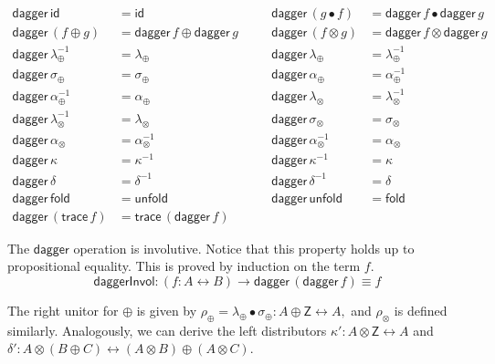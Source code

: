 \documentclass[runningheads,a4paper]{llncs}
\newcommand{\Ty}{\mathsf{Ty}}
\newcommand{\id}{\mathsf{id}}
\newcommand{\lr}{\longleftrightarrow}
\newcommand{\fold}{\mathsf{fold}}
\newcommand{\unfold}{\mathsf{unfold}}
\newcommand{\trace}{\ensuremath{\mathsf{trace}}}
\newcommand{\Z}{\mathsf{Z}}
\renewcommand{\dagger}{\mathsf{dagger}}
\begin{document}
\[
\begin{array}{llcll}
\dagger \,\id &= \id & \quad &
\dagger\, (g \bullet f) & = \dagger\, f \bullet \dagger\, g \\
\dagger\, (f \oplus g) & = \dagger\, f \oplus \dagger\, g & \quad &
\dagger\, (f \otimes g) & = \dagger\, f \otimes \dagger\, g \\
\dagger\, \lambda_\oplus ^{-1} & = \lambda_\oplus & \quad &
\dagger\, \lambda_\oplus & = \lambda_\oplus^{-1} \\
\dagger\, \sigma_\oplus & = \sigma_\oplus & \quad &
\dagger\, \alpha_\oplus & = \alpha_\oplus^{-1} \\
\dagger\, \alpha_\oplus^{-1} & = \alpha_\oplus & \quad &
\dagger\, \lambda_\otimes & = \lambda_\otimes^{-1} \\
\dagger\, \lambda_\otimes ^{-1} & = \lambda_\otimes & \quad &
\dagger\, \sigma_\otimes & = \sigma_\otimes \\
\dagger\, \alpha_\otimes & = \alpha_\otimes^{-1} & \quad &
\dagger\, \alpha_\otimes^{-1} & = \alpha_\otimes \\
\dagger\, \kappa & = \kappa^{-1} & \quad &
\dagger\, \kappa^{-1} & = \kappa \\
\dagger\, \delta & = \delta^{-1} & \quad &
\dagger\, \delta^{-1} & = \delta \\
\dagger\, \fold & = \unfold & \quad &
\dagger\, \unfold & = \fold \\
\dagger\, (\trace \,f) & = \trace \,(\dagger\, f)
\end{array}
\]

The $\dagger$ operation is involutive. Notice that this property holds
up to propositional equality. This is proved by induction on the term
$f$.
\[
\mathsf{daggerInvol} : (f : A \lr B) \to \dagger \,(\dagger\,f) \equiv f
\]

The right unitor for $\oplus$ is given by $\rho_\oplus = \lambda_\oplus \bullet
\sigma_\oplus : A \oplus \Z \lr A,$ and $\rho_\otimes$ is defined similarly.
Analogously, we can derive the left distributors $\kappa' : A \otimes \Z
\lr A$ and $\delta' : A \otimes (B \oplus C) \lr (A \otimes B) \oplus
(A \otimes C)$.
\end{document}
